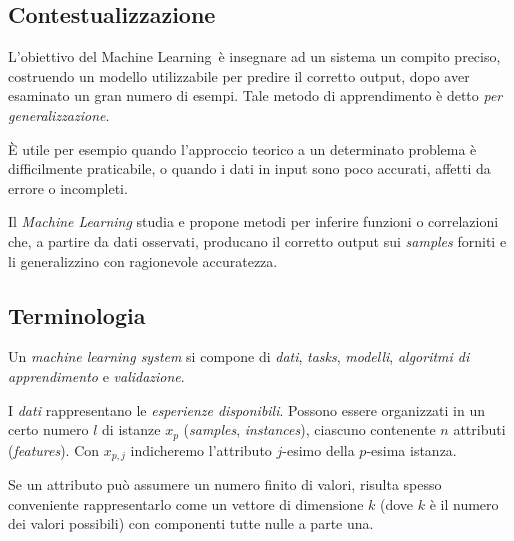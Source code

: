 
\def\ml{Machine Learning}


\subsection{Contestualizzazione}

L'obiettivo del \ml\ è insegnare ad un sistema un compito preciso, costruendo un modello utilizzabile per predire il corretto output, dopo aver esaminato un gran numero di esempi. Tale metodo di apprendimento è detto \emph{per generalizzazione}.

È utile per esempio quando l'approccio teorico a un determinato problema è difficilmente praticabile, o quando i dati in input sono poco accurati, affetti da errore o incompleti.

\begin{definition}
Il \emph{\ml} studia e propone metodi per inferire funzioni o correlazioni che, a partire da dati osservati, producano il corretto output sui \emph{samples} forniti e li generalizzino con ragionevole accuratezza.
\end{definition}

\subsection{Terminologia}

Un \emph{machine learning system} si compone di \emph{dati}, \emph{tasks}, \emph{modelli}, \emph{algoritmi di apprendimento} e \emph{validazione}.

\begin{definition}[Dati]
I \emph{dati} rappresentano le \emph{esperienze disponibili}. Possono essere organizzati in un certo numero $l$ di istanze $x_p$ (\emph{samples}, \emph{instances}), ciascuno contenente $n$ attributi (\emph{features}). Con $x_{p,j}$ indicheremo l'attributo $j$-esimo della $p$-esima istanza. 
\end{definition}


\begin{remark}
	Se un attributo può assumere un numero finito di valori, risulta spesso conveniente rappresentarlo come un vettore di dimensione $k$ (dove $k$ è il numero dei valori possibili) con componenti tutte nulle a parte una.
\end{remark}

